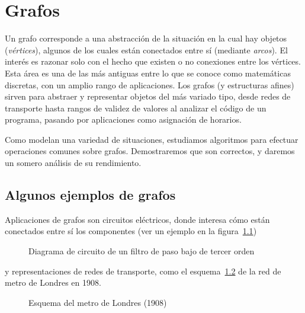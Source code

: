 %

\chapter{Grafos}
\label{cha:grafos}

  Un grafo corresponde a una abstracción
  de la situación en la cual hay objetos (\emph{vértices}),
  algunos de los cuales están conectados entre sí
  (mediante \emph{arcos}).
  El interés es razonar solo con el hecho
  que existen o no conexiones entre los vértices.
  Esta área es una de las más antiguas entre lo que se conoce
  como matemáticas discretas,
  con un amplio rango de aplicaciones.
  Los grafos
  (y estructuras afines)
  sirven para abstraer y representar objetos del más variado tipo,
  desde redes de transporte
  hasta rangos de validez de valores al analizar el código de un programa,
  pasando por aplicaciones como asignación de horarios.

  Como modelan una variedad de situaciones,
  estudiamos algoritmos para efectuar operaciones comunes sobre grafos.
  Demostraremos que son correctos,
  y daremos un somero análisis de su rendimiento.

\section{Algunos ejemplos de grafos}
\label{sec:ejemplos-grafos}

  Aplicaciones de grafos son circuitos eléctricos,
  donde interesa cómo están conectados entre sí los componentes
  (ver un ejemplo en la figura~\ref{fig:circuito-electrico})
  \begin{figure}[htbp]
    \centering
    \caption[Diagrama de circuito de un filtro de paso bajo
	     de tercer orden]
	    {Diagrama de circuito de un filtro de paso bajo
	     de tercer orden~\cite{wikimedia06:LowPass3poleCauer}}
    \label{fig:circuito-electrico}
  \end{figure}
  y representaciones de redes de transporte,
  como el esquema~\ref{fig:tube-1908}
  de la red de metro de Londres en 1908.
  \begin{figure}[htbp]
    \centering
    \caption[Esquema del metro de Londres (1908)]
	    {Esquema del metro de Londres (1908)~%
	       \cite{London_tube1908}}
    \label{fig:tube-1908}
  \end{figure}

